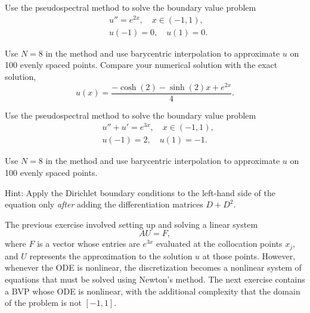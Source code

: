\begin{problem}
Use the pseudospectral method to solve the boundary value problem
\begin{align*}
	&{ } u'' = e^{2x}, \quad x \in (-1,1), \\
	&{ } u(-1) = 0, \quad u(1) = 0.
\end{align*}

Use $N=8$ in the  method and use barycentric interpolation to approximate $u$ on 100 evenly spaced points.
Compare your numerical solution with the exact solution,
\begin{equation*}
	u(x) = \frac{- \cosh(2) - \sinh(2)x + e^{2x}}{4}.
\end{equation*}
\end{problem}


\begin{problem}
	Use the pseudospectral method to solve the boundary value problem
	\begin{align*}
	&{ } u'' + u' = e^{3x}, \quad x \in (-1,1), \\
	&{ } u(-1) = 2, \quad u(1) = -1.
	\end{align*}

	Use $N=8$ in the  method and use barycentric interpolation to approximate $u$ on 100 evenly spaced points.

Hint: Apply the Dirichlet boundary conditions to the left-hand side of the equation only \emph{after} adding the differentiation matrices $D+D^2$.
\end{problem}

The previous exercise involved setting up and solving a linear system
\begin{equation*}
	AU = F,
\end{equation*}
where $F$ is a vector whose entries are $e^{3x}$ evaluated at the collocation points $x_j$, and $U$ represents the approximation to the solution $u$ at those points.
However, whenever the ODE is nonlinear, the discretization becomes a nonlinear system of equations that must be solved using Newton's method.
The next exercise contains a BVP whose ODE is nonlinear, with the additional complexity that the domain of the problem is not $[-1,1]$.

